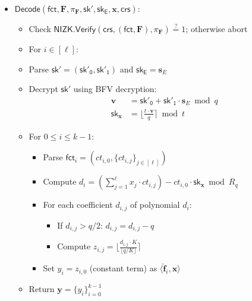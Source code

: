 \begin{itemize}
\item $\mathsf{Decode}(\mathsf{fct}, \mathbf{F}, \pi_{\mathbf{F}}, \mathsf{sk'}, \mathsf{sk_E}, \mathbf{x}, \mathsf{crs})$:
   \begin{itemize}
       \item Check $\mathsf{NIZK.Verify}(\mathsf{crs}, (\mathsf{fct},\mathbf{F}), \pi_{\mathbf{F}}) \stackrel{?}{=} 1$; otherwise abort
       \item For $i\in [\ell]$:
       \item Parse $\mathsf{sk'} = (\mathsf{sk'_0}, \mathsf{sk'_1})$ and $\mathsf{sk_E} = \mathbf{s}_E$
       \item Decrypt $\mathsf{sk'}$ using BFV decryption:
           \begin{align*}
           \mathbf{v} &= \mathsf{sk'_0} + \mathsf{sk'_1} \cdot \mathbf{s}_E \bmod q \\
           \mathsf{sk}_{\mathbf{x}} &= \lfloor \frac{t \cdot \mathbf{v}}{q} \rceil \bmod t
           \end{align*}
       \item For $0\leq i\leq k-1$:
       \begin{itemize}
           \item Parse $\mathsf{fct}_i = (ct_{i,0}, \{ct_{i,j}\}_{j\in[\ell]})$
           \item Compute $d_i = \left(\sum_{j=1}^\ell x_j \cdot ct_{i,j}\right) - ct_{i,0} \cdot \mathsf{sk}_{\mathbf{x}} \bmod R_q$
           \item For each coefficient $d_{i,j}$ of polynomial $d_i$:
               \begin{itemize}
                   \item If $d_{i,j} > q/2$: $d_{i,j} = d_{i,j} - q$
                   \item Compute $z_{i,j} = \lfloor \frac{d_{i,j} \cdot K}{\lfloor q/K \rfloor} \rceil$
               \end{itemize}
           \item Set $y_i = z_{i,0}$ (constant term) as $\langle \mathbf{\hat{f}}_i, \mathbf{x} \rangle$
       \end{itemize}
       \item Return $\mathbf{y}=\{y_i\}_{i=0}^{k-1}$
   \end{itemize}


\end{itemize}
